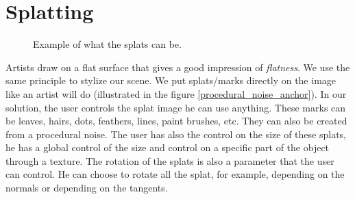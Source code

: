 \section{Splatting}

\begin{figure}
    \begin{center}
    \end{center}
    \caption{Example of what the splats can be.}
    \label{splat_examples}
\end{figure}

Artists draw on a flat surface that gives a good impression of \textit{flatness}. We use the same principle to stylize our scene. We put splats/marks directly on the image like an artist will do (illustrated in the figure \ref{procedural_noise_anchor}). In our solution, the user controls the splat image he can use anything. These marks can be leaves, hairs, dots, feathers, lines, paint brushes, etc. They can also be created from a procedural noise. The user has also the control on the size of these splats, he has a global control of the size and control on a specific part of the object through a texture. The rotation of the splats is also a parameter that the user can control. He can choose to rotate all the splat, for example, depending on the normals or depending on the tangents. \newline


